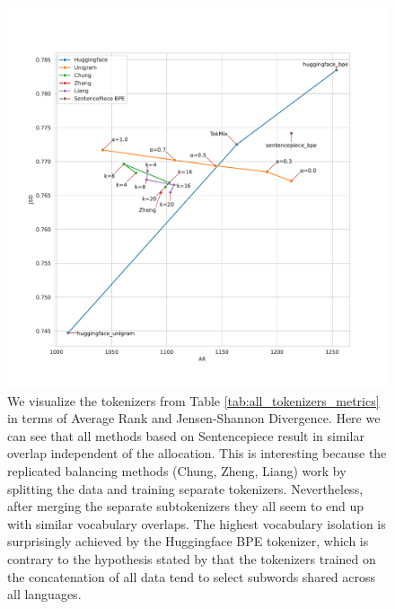 \begin{figure}
    \centering
    \includegraphics[width=\textwidth]{figures/all_tokenizers_AR_vs_JSD.pdf}
    \caption{We visualize the tokenizers from Table \ref{tab:all_tokenizers_metrics} in terms of Average Rank and Jensen-Shannon Divergence. Here we can see that all methods based on Sentencepiece result in similar overlap independent of the allocation. This is interesting because the replicated balancing methods (Chung, Zheng, Liang) work by splitting the data and training separate tokenizers. Nevertheless, after merging the separate subtokenizers they all seem to end up with similar vocabulary overlaps. The highest vocabulary isolation is surprisingly achieved by the Huggingface BPE tokenizer, which is contrary to the hypothesis stated by \citet{chung_improving_2020,zheng_allocating_2021} that the tokenizers trained on the concatenation of all data tend to select subwords shared across all languages.}
    \label{fig:all_tokenizers_AR_vs_JSD}
\end{figure}

